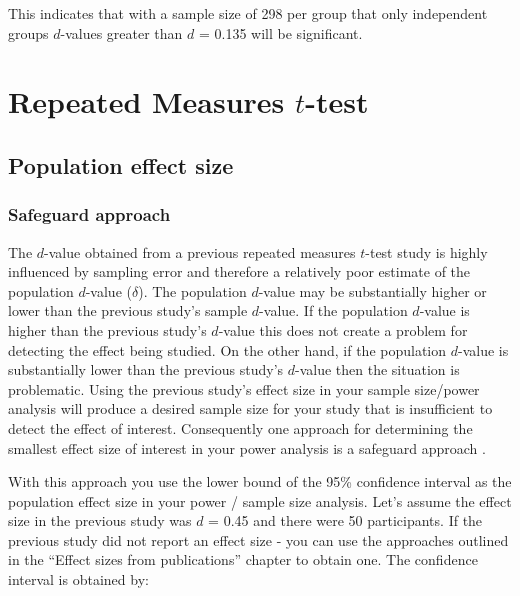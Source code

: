 \documentclass[
]{krantz}
\begin{document}
This indicates that with a sample size of 298 per group that only independent groups \(d\)-values greater than \(d\) = 0.135 will be significant.

\hypertarget{repeated-measures-t-test}{%
\section{\texorpdfstring{Repeated Measures \(t\)-test}{Repeated Measures t-test}}\label{repeated-measures-t-test}}

\hypertarget{population-effect-size-1}{%
\subsection{Population effect size}\label{population-effect-size-1}}

\hypertarget{safeguard-approach-1}{%
\subsubsection{Safeguard approach}\label{safeguard-approach-1}}

The \(d\)-value obtained from a previous repeated measures \(t\)-test study is highly influenced by sampling error and therefore a relatively poor estimate of the population \(d\)-value (\(\delta\)). The population \(d\)-value may be substantially higher or lower than the previous study's sample \(d\)-value. If the population \(d\)-value is higher than the previous study's \(d\)-value this does not create a problem for detecting the effect being studied. On the other hand, if the population \(d\)-value is substantially lower than the previous study's \(d\)-value then the situation is problematic. Using the previous study's effect size in your sample size/power analysis will produce a desired sample size for your study that is insufficient to detect the effect of interest. Consequently one approach for determining the smallest effect size of interest in your power analysis is a safeguard approach \citep{perugini2014safeguard}.

With this approach you use the lower bound of the 95\% confidence interval as the population effect size in your power / sample size analysis. Let's assume the effect size in the previous study was \(d\) = 0.45 and there were 50 participants. If the previous study did not report an effect size - you can use the approaches outlined in the ``Effect sizes from publications'' chapter to obtain one. The confidence interval is obtained by:
\end{document}
